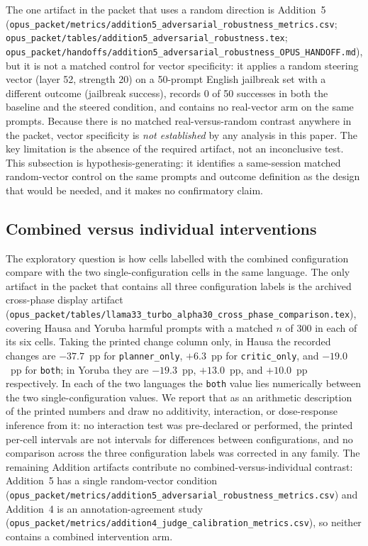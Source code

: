 The one artifact in the packet that uses a random direction is Addition~5
(\texttt{opus\_packet/metrics/addition5\_adversarial\_robustness\_metrics.csv};
\texttt{opus\_packet/tables/addition5\_adversarial\_robustness.tex};
\texttt{opus\_packet/handoffs/addition5\_adversarial\_robustness\_OPUS\_HANDOFF.md}),
but it is not a matched control for vector specificity: it applies a random
steering vector (layer 52, strength 20) on a 50-prompt English jailbreak set
with a different outcome (jailbreak success), records 0 of 50 successes in both
the baseline and the steered condition, and contains no real-vector arm on the
same prompts. Because there is no matched real-versus-random contrast anywhere
in the packet, vector specificity is \emph{not established} by any analysis in
this paper. The key limitation is the absence of the required artifact, not an
inconclusive test. This subsection is hypothesis-generating: it identifies a
same-session matched random-vector control on the same prompts and outcome
definition as the design that would be needed, and it makes no confirmatory
claim.

\subsection{Combined versus individual interventions}

The exploratory question is how cells labelled with the combined configuration
compare with the two single-configuration cells in the same language. The only
artifact in the packet that contains all three configuration labels is the
archived cross-phase display artifact
(\texttt{opus\_packet/tables/llama33\_turbo\_alpha30\_cross\_phase\_comparison.tex}),
covering Hausa and Yoruba harmful prompts with a matched $n$ of 300 in each of
its six cells. Taking the printed change column only, in Hausa the recorded
changes are $-37.7$~pp for \texttt{planner\_only}, $+6.3$~pp for
\texttt{critic\_only}, and $-19.0$~pp for \texttt{both}; in Yoruba they are
$-19.3$~pp, $+13.0$~pp, and $+10.0$~pp respectively. In each of the two
languages the \texttt{both} value lies numerically between the two
single-configuration values. We report that as an arithmetic description of the
printed numbers and draw no additivity, interaction, or dose-response inference
from it: no interaction test was pre-declared or performed, the printed
per-cell intervals are not intervals for differences between configurations, and
no comparison across the three configuration labels was corrected in any
family. The remaining Addition artifacts contribute no combined-versus-individual
contrast: Addition~5 has a single random-vector condition
(\texttt{opus\_packet/metrics/addition5\_adversarial\_robustness\_metrics.csv})
and Addition~4 is an annotation-agreement study
(\texttt{opus\_packet/metrics/addition4\_judge\_calibration\_metrics.csv}), so
neither contains a combined intervention arm.

